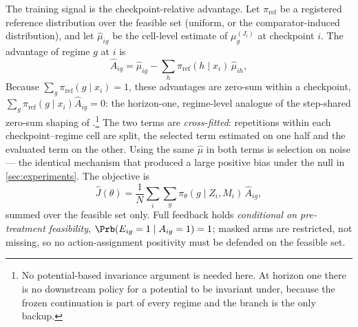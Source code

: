 The training signal is the checkpoint-relative advantage.  Let
$\pi_{\mathrm{ref}}$ be a registered reference distribution over the feasible
set (uniform, or the comparator-induced distribution), and let
$\widehat\mu_{ig}$ be the cell-level estimate of $\mu^{(J_i)}_g$ at checkpoint
$i$.  The advantage of regime $g$ at $i$ is
\begin{equation}
 \widehat A_{ig}=\widehat\mu_{ig}-\sum_{h}\pi_{\mathrm{ref}}(h\mid x_i)\,\widehat\mu_{ih},
 \label{eq:checkpoint-advantage}
\end{equation}
Because $\sum_g\pi_{\mathrm{ref}}(g\mid x_i)=1$, these advantages are zero-sum
within a checkpoint,
$\sum_g\pi_{\mathrm{ref}}(g\mid x_i)\widehat A_{ig}=0$: the horizon-one,
regime-level analogue of the step-shared zero-sum shaping of
\citet[Prop.~2]{adrs2026}.\footnote{No potential-based invariance argument is
needed here. At horizon one there is no downstream policy for a potential to be
invariant under, because the frozen continuation is part of every regime and the
branch is the only backup.}
The two terms are \emph{cross-fitted}: repetitions within each
checkpoint--regime cell are split, the selected term estimated on one half and
the evaluated term on the other.  Using the same $\widehat\mu$ in both terms is
selection on noise --- the identical mechanism that produced a large positive bias
under the null in \cref{sec:experiments}.  The objective is
\begin{equation}
 \widehat J(\theta)=\frac1N\sum_i\sum_{g}\pi_\theta(g\mid Z_i,M_i)\,\widehat A_{ig},
 \label{eq:rl-objective}
\end{equation}
summed over the feasible set only.  Full feedback holds \emph{conditional on
pre-treatment feasibility}, $\Prb(E_{ig}=1\mid A_{ig}=1)=1$; masked arms are
restricted, not missing, so no action-assignment positivity must be defended on
the feasible set.


